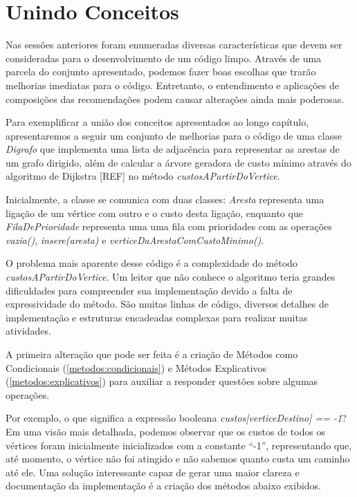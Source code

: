 \section{Unindo Conceitos}
\label{unindo_conceitos}
Nas sessões anteriores foram enumeradas diversas características que devem ser consideradas para o desenvolvimento de 
um código limpo. Através de uma parcela do conjunto apresentado, podemos fazer boas escolhas que trarão melhorias 
imediatas para o código. Entretanto, o entendimento e aplicações de composições das recomendações podem causar 
alterações ainda mais poderosas.

Para exemplificar a união dos conceitos apresentados ao longo capítulo, apresentaremos a seguir um 
conjunto de melhorias para o código de uma classe \textit{Digrafo} que implementa uma lista de adjacência para 
representar as arestas de um grafo dirigido, além de calcular a árvore geradora de custo mínimo através do algoritmo de 
Dijkstra [REF] no método \textit{custosAPartirDoVertice}.

Inicialmente, a classe se comunica com duas classes: \textit{Aresta} representa uma ligação de um vértice com outro e o 
custo desta ligação, enquanto que \textit{FilaDePrioridade} representa uma uma fila com prioridades com as operações 
\textit{vazia()}, \textit{insere(aresta)} e \textit{verticeDaArestaComCustoMinimo()}.



O problema mais aparente desse código é a complexidade do método \textit{custosAPartirDoVertice}. Um leitor 
que não conhece o algoritmo teria grandes dificuldades para compreender sua implementação devido a falta de 
expressividade do método. São muitas linhas de código, diversos detalhes de implementação e estruturas encadeadas 
complexas para realizar muitas atividades. 

A primeira alteração que pode ser feita é a criação de Métodos como Condicionais (\ref{metodos:condicionais}) e 
Métodos Explicativos (\ref{metodos:explicativos}) para auxiliar a responder questões sobre algumas operações.

Por exemplo, o que significa a expressão booleana \textit{custos[verticeDestino] == -1}? Em uma visão mais detalhada, 
podemos observar que os custos de todos os vértices foram inicialmente inicializados com a constante ``-1'', 
representando que, até momento, o vértice não foi atingido e não sabemos quanto custa um caminho até ele. Uma solução 
interessante capaz de gerar uma maior clareza e documentação da implementação é a criação dos métodos abaixo
exibidos.

